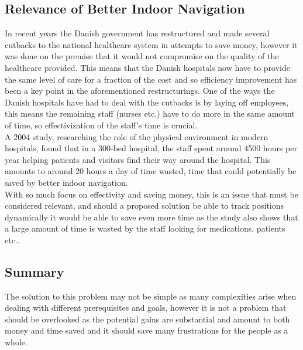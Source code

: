 \subsection{Relevance of Better Indoor Navigation}
In recent years the Danish government has restructured and made several cutbacks to the national healthcare system in attempts to save money\cite{cutback_danNHS}, however it was done on the premise that it would not compromise on the quality of the healthcare provided. This means that the Danish hospitals now have to provide the same level of care for a fraction of the cost and so efficiency improvement has been a key point in the aforementioned restructurings. One of the ways the Danish hospitals have had to deal with the cutbacks is by laying off employees\cite{cutback_firing}, this means the remaining staff (nurses etc.) have to do more in the same amount of time, so effectivization of the staff's time is crucial.\\
A 2004 study\cite{twaste_2004}, researching the role of the physical environment in modern hospitals, found that in a 300-bed hospital, the staff spent around 4500 hours per year helping patients and visitors find their way around the hospital. This amounts to around 20 hours a day of time wasted, time that could potentially be saved by better indoor navigation.\\
With so much focus on effectivity and saving money, this is an issue that must be considered relevant, and should a proposed solution be able to track positions dynamically it would be able to save even more time as the study also shows that a large amount of time is wasted by the staff looking for medications, patients etc..

\subsection{Summary}
The solution to this problem may not be simple as many complexities arise when dealing with different prerequisites and goals, however it is not a problem that should be overlooked as the potential gains are substantial and amount to both money and time saved and it should save many frustrations for the people as a whole.